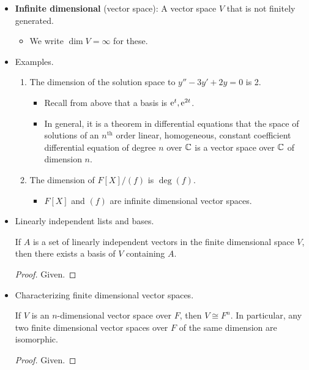 \documentclass[../notes.tex]{subfiles}
\begin{document}
\begin{itemize}
    \item \textbf{Infinite dimensional} (vector space): A vector space $V$ that is not finitely generated.
    \begin{itemize}
        \item We write $\dim V=\infty$ for these.
    \end{itemize}
    \item Examples.
    \begin{enumerate}
        \item The dimension of the solution space to $y''-3y'+2y=0$ is 2.
        \begin{itemize}
            \item Recall from above that a basis is $\e[t],\e[2t]$.
            \item In general, it is a theorem in differential equations that the space of solutions of an $n^\text{th}$ order linear, homogeneous, constant coefficient differential equation of degree $n$ over $\C$ is a vector space over $\C$ of dimension $n$.
        \end{itemize}
        \item The dimension of $F[X]/(f)$ is $\deg(f)$.
        \begin{itemize}
            \item $F[X]$ and $(f)$ are infinite dimensional vector spaces.
        \end{itemize}
    \end{enumerate}
    \item Linearly independent lists and bases.
    \begin{corollary}\label{cly:11.5}
        If $A$ is a set of linearly independent vectors in the finite dimensional space $V$, then there exists a basis of $V$ containing $A$.
        \begin{proof}
            Given.
        \end{proof}
    \end{corollary}
    \item Characterizing finite dimensional vector spaces.
    \begin{theorem}\label{trm:11.6}
        If $V$ is an $n$-dimensional vector space over $F$, then $V\cong F^n$. In particular, any two finite dimensional vector spaces over $F$ of the same dimension are isomorphic.
        \begin{proof}
            Given.
        \end{proof}
    \end{theorem}

\end{itemize}
\end{document}
